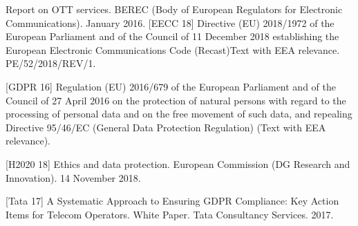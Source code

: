 \documentclass[12pt]{amsart}
\begin{document}
\begin{multicols}{2}
\begin{thebibliography}{9}
 Report on OTT services. BEREC (Body of European Regulators for Electronic Communications). January 2016.
 [EECC 18] Directive (EU) 2018/1972 of the European
  Parliament and of the Council of 11 December 2018 establishing the
  European Electronic Communications Code (Recast)Text with EEA
  relevance. PE/52/2018/REV/1.

 [GDPR 16] Regulation (EU) 2016/679 of the European
  Parliament and of the Council of 27 April 2016 on the protection of
  natural persons with regard to the processing of personal data and
  on the free movement of such data, and repealing Directive 95/46/EC
  (General Data Protection Regulation) (Text with EEA relevance).

 [H2020 18] Ethics and data protection. European
  Commission (DG Research and Innovation). 14 November 2018.

 [Tata 17] A Systematic Approach to Ensuring GDPR
    Compliance: Key Action Items for Telecom Operators. White
    Paper. Tata Consultancy Services. 2017.

\end{thebibliography}
\clearpage


\end{multicols}
\end{document}
